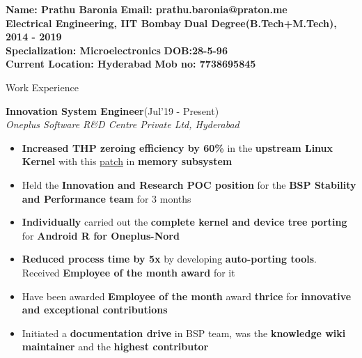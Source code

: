 \documentclass{resume}
\newcommand{\sepval}{-0.5em}
\begin{document}

{\bf Name: Prathu Baronia} \hfill {\bf Email: prathu.baronia@praton.me}\\
{\bf Electrical Engineering, IIT Bombay} \hfill {\bf Dual Degree(B.Tech+M.Tech),
	2014 - 2019}\\
{\bf Specialization: Microelectronics} \hfill {\bf DOB:28-5-96}\\
{\bf Current Location: Hyderabad} \hfill {\bf Mob no: 7738695845}\\


\begin{rSection}{Work Experience}

\vspace{-.4cm}
 
\item{\bf {\bf Innovation System Engineer}}\hfill{(Jul'19 - Present)}\\
	\emph{Oneplus Software R\&D Centre Private Ltd, Hyderabad}\\
[-0.4cm]

\begin{itemize}[leftmargin=*]

	\itemsep \sepval

	\item {\bf Increased THP zeroing efficiency by 60\%} in the {\bf upstream
		Linux Kernel} with this
		\href{https://github.com/hnaz/linux-mm/commit/8d9c9dbbeb54b980971085f1696758389e5d0675}{patch}
		in {\bf memory subsystem}

	\item Held the {\bf Innovation and Research POC position} for the {\bf BSP Stability
		and Performance team} for 3 months
	
	\item {\bf Individually} carried out the {\bf complete kernel and device tree
		porting} for {\bf Android R for Oneplus-Nord}
	
	\item {\bf Reduced process time by 5x} by developing {\bf auto-porting tools}. Received {\bf Employee of the month award} for
		it
		
	\item Have been awarded {\bf Employee of the month} award {\bf thrice} for {\bf innovative and exceptional
		contributions}

	\item Initiated a {\bf documentation drive} in BSP team, was the
		{\bf knowledge wiki maintainer} and the {\bf highest
		contributor}

\end{itemize}

\end{rSection}
\end{document}
